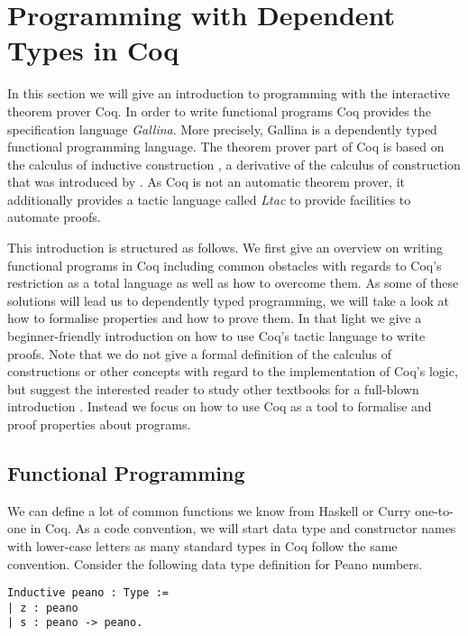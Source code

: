 \section{Programming with Dependent Types in Coq}
\label{sec:progDT}

In this section we will give an introduction to programming with the interactive theorem prover Coq.
In order to write functional programs Coq provides the specification language \emph{Gallina}.
More precisely, Gallina is a dependently typed functional programming language.
The theorem prover part of Coq is based on the calculus of inductive construction \citep{coquand1988inductively}, a derivative of the calculus of construction that was introduced by \citet{coquand1986calculus}.
As Coq is not an automatic theorem prover, it additionally provides a tactic language called \emph{Ltac} to provide facilities to automate proofs.

This introduction is structured as follows.
We first give an overview on writing functional programs in Coq including common obstacles with regards to Coq's restriction as a total language as well as how to overcome them.
As some of these solutions will lead us to dependently typed programming, we will take a look at how to formalise properties and how to prove them.
In that light we give a beginner-friendly introduction on how to use Coq's tactic language to write proofs.
Note that we do not give a formal definition of the calculus of constructions or other concepts with regard to the implementation of Coq's logic, but suggest the interested reader to study other textbooks for a full-blown introduction \citep{pierce2010software, chlipala2011certified}.
Instead we focus on how to use Coq as a tool to formalise and proof properties about programs.

\subsection{Functional Programming}

We can define a lot of common functions we know from Haskell or Curry one-to-one in Coq.
As a code convention, we will start data type and constructor names with lower-case letters as many standard types in Coq follow the same convention.
Consider the following data type definition for Peano numbers.

\begin{verbatim}
Inductive peano : Type :=
| z : peano
| s : peano -> peano.
\end{verbatim}

